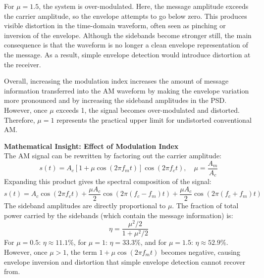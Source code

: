 \documentclass[12pt]{article}
\begin{document}
For $\mu = 1.5$, the system is over-modulated. Here, the message amplitude exceeds the carrier amplitude, so the envelope attempts to go below zero. This produces visible distortion in the time-domain waveform, often seen as pinching or inversion of the envelope. Although the sidebands become stronger still, the main consequence is that the waveform is no longer a clean envelope representation of the message. As a result, simple envelope detection would introduce distortion at the receiver.

Overall, increasing the modulation index increases the amount of message information transferred into the AM waveform by making the envelope variation more pronounced and by increasing the sideband amplitudes in the PSD. However, once $\mu$ exceeds 1, the signal becomes over-modulated and distorted. Therefore, $\mu = 1$ represents the practical upper limit for undistorted conventional AM.




\begin{mdframed}[linewidth=1pt]
\textbf{Mathematical Insight: Effect of Modulation Index}\\[6pt]
The AM signal can be rewritten by factoring out the carrier amplitude:
\[
s(t) = A_c\left[1 + \mu\cos(2\pi f_m t)\right]\cos(2\pi f_c t), \quad \mu = \frac{A_m}{A_c}
\]
Expanding this product gives the spectral composition of the signal:
\[
s(t) = A_c\cos(2\pi f_c t) + \frac{\mu A_c}{2}\cos(2\pi(f_c - f_m)t) + \frac{\mu A_c}{2}\cos(2\pi(f_c + f_m)t)
\]
The sideband amplitudes are directly proportional to $\mu$. The fraction of total power 
carried by the sidebands (which contain the message information) is:
\[
\eta = \frac{\mu^2/2}{1 + \mu^2/2}
\]
For $\mu = 0.5$: $\eta \approx 11.1\%$, for $\mu = 1$: $\eta = 33.3\%$, 
and for $\mu = 1.5$: $\eta \approx 52.9\%$. However, once $\mu > 1$, 
the term $1 + \mu\cos(2\pi f_m t)$ becomes negative, causing envelope inversion 
and distortion that simple envelope detection cannot recover from.
\end{mdframed}
\end{document}
